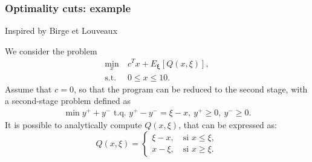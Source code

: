 \documentclass{beamer}
\def\bxi{\boldsymbol\xi}
\def\bxi{\boldsymbol\xi}
\begin{document}
	

	



	
	


	
	

\begin{frame}
\frametitle{Optimality cuts: example}
	
{\red Inspired by Birge et Louveaux}
	
We consider the problem
\begin{align*}
\min_x\ & c^Tx + E_{\bxi} [ Q(x,\xi) ],\\
\mbox{s.t. } & 0 \leq x \leq 10.
\end{align*}
Assume that $c = 0$, so that the program can be reduced to the second stage, with a second-stage problem defined as
\begin{align*}
\min y^++y^- \mbox{ t.q. } y^+-y^- = \xi - x,\ y^+ \geq 0,\ y^- \geq 0.
\end{align*}
It is possible to analytically compute $Q(x,\xi)$, that can be expressed as:
\[
Q(x,\xi) =
\begin{cases}
\xi - x,\quad \mbox{si } x \leq \xi,\\
x - \xi,\quad \mbox{si } x \geq \xi.
\end{cases}
\]
	
\end{frame}
\end{document}
